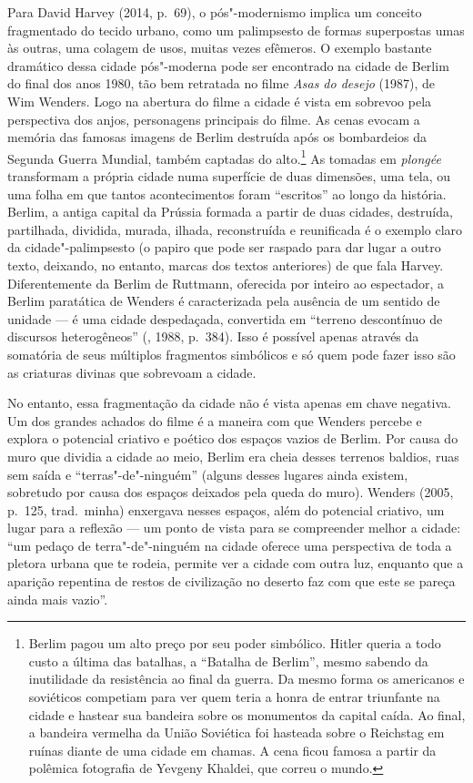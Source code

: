 Para David Harvey (2014, p.~69), o pós"-modernismo implica um conceito
fragmentado do tecido urbano, como um palimpsesto de formas superpostas
umas às outras, uma colagem de usos, muitas vezes efêmeros. O exemplo
bastante dramático dessa cidade pós"-moderna pode ser encontrado na
cidade de Berlim do final dos anos 1980, tão bem retratada no filme
\emph{Asas do desejo} (1987), de Wim Wenders. Logo na abertura do filme
a cidade é vista em sobrevoo pela perspectiva dos anjos, personagens
principais do filme. As cenas evocam a memória das famosas imagens de
Berlim destruída após os bombardeios da Segunda Guerra Mundial, também
captadas do alto.\footnote{Berlim pagou um alto preço por seu poder
  simbólico. Hitler queria a todo custo a última das batalhas, a
  ``Batalha de Berlim'', mesmo sabendo da inutilidade da resistência ao
  final da guerra. Da mesmo forma os americanos e soviéticos competiam
  para ver quem teria a honra de entrar triunfante na cidade e hastear
  sua bandeira sobre os monumentos da capital caída. Ao final, a
  bandeira vermelha da União Soviética foi hasteada sobre o Reichstag em
  ruínas diante de uma cidade em chamas. A cena ficou famosa a partir da
  polêmica fotografia de Yevgeny Khaldei, que correu o mundo.} As
tomadas em \emph{plongée} transformam a própria cidade numa superfície
de duas dimensões, uma tela, ou uma folha em que tantos acontecimentos
foram ``escritos'' ao longo da história. Berlim, a antiga capital da
Prússia formada a partir de duas cidades, destruída, partilhada,
dividida, murada, ilhada, reconstruída e reunificada é o exemplo claro
da cidade"-palimpsesto (o papiro que pode ser raspado para dar lugar a
outro texto, deixando, no entanto, marcas dos textos anteriores) de que
fala Harvey. Diferentemente da Berlim de Ruttmann, oferecida por inteiro
ao espectador, a Berlim paratática de Wenders é caracterizada pela
ausência de um sentido de unidade --- é uma cidade despedaçada,
convertida em ``terreno descontínuo de discursos heterogêneos'' (,
1988, p.~384). Isso é possível apenas através da somatória de seus
múltiplos fragmentos simbólicos e só quem pode fazer isso são as
criaturas divinas que sobrevoam a cidade.

No entanto, essa fragmentação da cidade não é vista apenas em chave
negativa. Um dos grandes achados do filme é a maneira com que Wenders
percebe e explora o potencial criativo e poético dos espaços vazios de
Berlim. Por causa do muro que dividia a cidade ao meio, Berlim era cheia
desses terrenos baldios, ruas sem saída e ``terras"-de"-ninguém'' (alguns
desses lugares ainda existem, sobretudo por causa dos espaços deixados
pela queda do muro). Wenders (2005, p.~125, trad.~minha) enxergava
nesses espaços, além do potencial criativo, um lugar para a reflexão ---
um ponto de vista para se compreender melhor a cidade: ``um pedaço de
terra"-de"-ninguém na cidade oferece uma perspectiva de toda a pletora
urbana que te rodeia, permite ver a cidade com outra luz, enquanto que a
aparição repentina de restos de civilização no deserto faz com que este
se pareça ainda mais vazio''.

